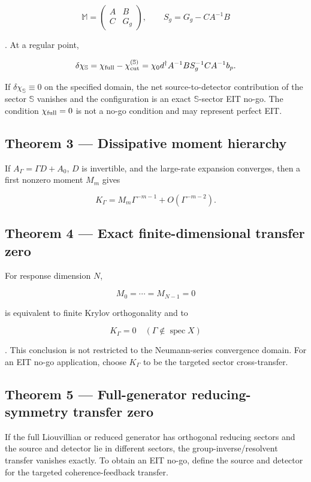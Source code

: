 \documentclass[
  10pt,
  a4paper,
]{article}
\begin{document}
\[
\mathbb M=
\begin{pmatrix}A&B\\C&G_g\end{pmatrix},
\qquad
S_g=G_g-CA^{-1}B
\]

. At a regular point,

\[
\delta\chi_{\mathbb S}
=\chi_{\rm full}-\chi_{\rm cut}^{(\mathbb S)}
=\chi_0d^\dagger A^{-1}BS_g^{-1}CA^{-1}b_p.
\]

If \(\delta\chi_{\mathbb S}\equiv0\) on the specified domain, the net
source-to-detector contribution of the sector \(\mathbb S\) vanishes and
the configuration is an exact \(\mathbb S\)-sector EIT no-go. The
condition \(\chi_{\rm full}=0\) is not a no-go condition and may
represent perfect EIT.

\subsection{Theorem 3 --- Dissipative moment
hierarchy}\label{theorem-3-dissipative-moment-hierarchy}

If \(A_\Gamma=\Gamma D+A_0\), \(D\) is invertible, and the large-rate
expansion converges, then a first nonzero moment \(M_m\) gives

\[
K_\Gamma
=M_m\Gamma^{-m-1}
+O(\Gamma^{-m-2}).
\]

\subsection{Theorem 4 --- Exact finite-dimensional transfer
zero}\label{theorem-4-exact-finite-dimensional-transfer-zero}

For response dimension \(N\),

\[
M_0=\cdots=M_{N-1}=0
\]

is equivalent to finite Krylov orthogonality and to

\[
K_\Gamma=0
\quad
(\Gamma\notin\operatorname{spec}X)
\]

. This conclusion is not restricted to the Neumann-series convergence
domain. For an EIT no-go application, choose \(K_\Gamma\) to be the
targeted sector cross-transfer.

\subsection{Theorem 5 --- Full-generator reducing-symmetry transfer
zero}\label{theorem-5-full-generator-reducing-symmetry-transfer-zero}

If the full Liouvillian or reduced generator has orthogonal reducing
sectors and the source and detector lie in different sectors, the
group-inverse/resolvent transfer vanishes exactly. To obtain an EIT
no-go, define the source and detector for the targeted
coherence-feedback transfer.
\end{document}

